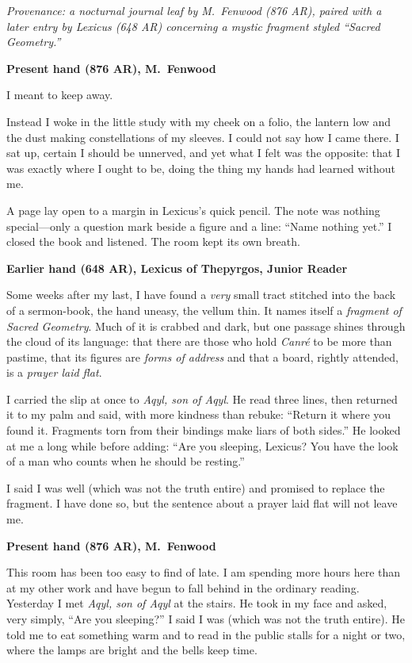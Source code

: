 \documentclass[11pt]{article}
\begin{document}
\noindent\textit{Provenance: a nocturnal journal leaf by M.\ Fenwood (876 AR), paired with a later entry by Lexicus (648 AR) concerning a mystic fragment styled ``Sacred Geometry.''}

\medskip
\noindent\textbf{Present hand (876 AR), M.\ Fenwood}

I meant to keep away.

Instead I woke in the little study with my cheek on a folio, the lantern low and the dust making constellations of my sleeves. I could not say how I came there. I sat up, certain I should be unnerved, and yet what I felt was the opposite: that I was exactly where I ought to be, doing the thing my hands had learned without me.

A page lay open to a margin in Lexicus’s quick pencil. The note was nothing special—only a question mark beside a figure and a line: ``Name nothing yet.'' I closed the book and listened. The room kept its own breath.

\medskip
\noindent\textbf{Earlier hand (648 AR), Lexicus of Thepyrgos, Junior Reader}

Some weeks after my last, I have found a \emph{very} small tract stitched into the back of a sermon-book, the hand uneasy, the vellum thin. It names itself a \textit{fragment of Sacred Geometry}. Much of it is crabbed and dark, but one passage shines through the cloud of its language: that there are those who hold \textit{Canr\'e} to be more than pastime, that its figures are \emph{forms of address} and that a board, rightly attended, is a \emph{prayer laid flat}.

I carried the slip at once to \textit{Aqyl, son of Aqyl}. He read three lines, then returned it to my palm and said, with more kindness than rebuke: ``Return it where you found it. Fragments torn from their bindings make liars of both sides.'' He looked at me a long while before adding: ``Are you sleeping, Lexicus? You have the look of a man who counts when he should be resting.''

I said I was well (which was not the truth entire) and promised to replace the fragment. I have done so, but the sentence about a prayer laid flat will not leave me.

\medskip
\noindent\textbf{Present hand (876 AR), M.\ Fenwood}

This room has been too easy to find of late. I am spending more hours here than at my other work and have begun to fall behind in the ordinary reading. Yesterday I met \textit{Aqyl, son of Aqyl} at the stairs. He took in my face and asked, very simply, ``Are you sleeping?'' I said I was (which was not the truth entire). He told me to eat something warm and to read in the public stalls for a night or two, where the lamps are bright and the bells keep time.
\end{document}
